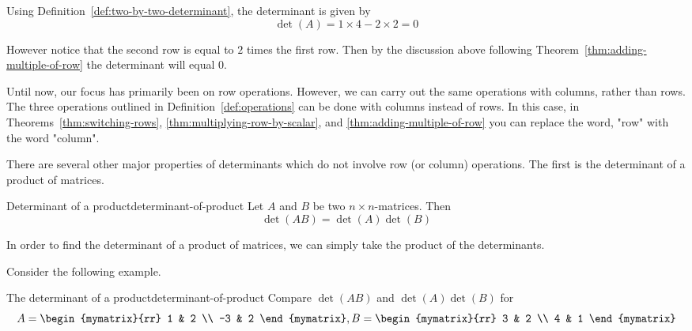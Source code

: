 \begin{solution}
Using Definition~\ref{def:two-by-two-determinant}, the determinant is given by
\[
\det (A) = 1 \times 4 - 2 \times 2 = 0
\]

However notice that the second row is equal to $2$ times the first row. Then by the discussion above following Theorem~\ref{thm:adding-multiple-of-row} the determinant will equal $0$.
\end{solution}

Until now, our focus has primarily been on row operations. However, we can carry out the 
same operations with columns, rather than rows. The three operations outlined in
Definition~\ref{def:operations} can be done with columns instead of rows. 
In this case, in Theorems~\ref{thm:switching-rows}, {\ref{thm:multiplying-row-by-scalar}}, 
and {\ref{thm:adding-multiple-of-row}} you can replace
the word, "row" with the word "column".

There are several other major properties of determinants which do not involve
row (or column) operations. The first is the determinant of a product of matrices. 

\begin{theorem}{Determinant of a product}{determinant-of-product}
Let $A$ and $B$ be two $n\times n$-matrices. Then
\begin{equation*}
\det (AB) =\det (A) \det (B)
\end{equation*}
\end{theorem}

In order to find the determinant of a product of matrices, we can simply take the product of the determinants. 

Consider the following example.

\begin{example}{The determinant of a product}{determinant-of-product}
Compare $\det (AB) $ and $\det (A) \det (
B) $ for
\begin{equation*}
A=\begin{mymatrix}{rr}
1 & 2 \\
-3 & 2
\end{mymatrix} ,B=\begin{mymatrix}{rr}
3 & 2 \\
4 & 1
\end{mymatrix} 
\end{equation*}
\end{example}


